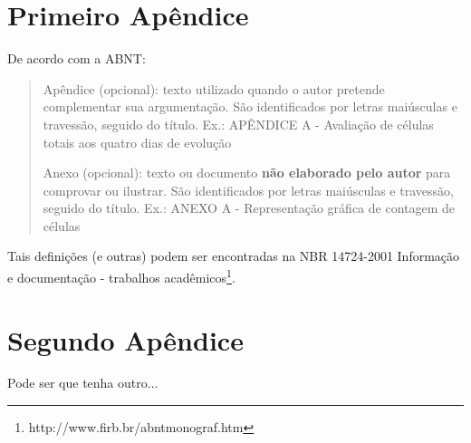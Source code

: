 \begin{apendicesenv}

\partapendices



\chapter{Primeiro Apêndice}

De acordo com a ABNT:

\begin{quotation}
Apêndice (opcional): texto utilizado quando o autor pretende complementar sua argumentação. São identificados por letras maiúsculas e travessão, seguido do título. Ex.: APÊNDICE A - Avaliação de células totais aos quatro dias de evolução

Anexo (opcional): texto ou documento \textbf{não elaborado pelo autor} para comprovar ou ilustrar. São identificados por letras maiúsculas e travessão, seguido do título. Ex.: ANEXO A - Representação gráfica de contagem de células
\end{quotation}

Tais definições (e outras) podem ser encontradas na NBR 14724-2001 Informação e documentação - trabalhos acadêmicos\footnote{http://www.firb.br/abntmonograf.htm}.


\chapter{Segundo Apêndice}

Pode ser que tenha outro...


\end{apendicesenv}
